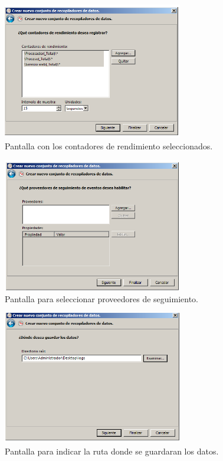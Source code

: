 \begin{figure}[H]
  \begin{center}
    \includegraphics[width=0.7\textwidth]{imagenes/rec5}
    \caption{Pantalla con los contadores de rendimiento seleccionados.}
    \label{fig10}
  \end{center}
\end{figure}

\begin{figure}[H]
  \begin{center}
    \includegraphics[width=0.7\textwidth]{imagenes/rec6}
    \caption{Pantalla para seleccionar proveedores de seguimiento.}
    \label{fig11}
  \end{center}
\end{figure}

\begin{figure}[H]
  \begin{center}
    \includegraphics[width=0.7\textwidth]{imagenes/rec7}
    \caption{Pantalla para indicar la ruta donde se guardaran los datos.}
    \label{fig12}
  \end{center}
\end{figure}



